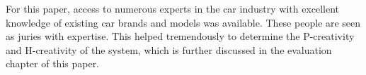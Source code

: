 For this paper, access to numerous experts in the car industry with excellent knowledge of existing car brands and models was available.
These people are seen as juries with expertise.
This helped tremendously to determine the P-creativity and H-creativity of the system, which is further discussed in the evaluation chapter of this paper.